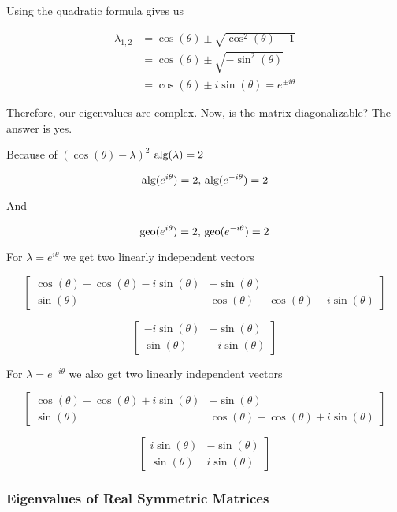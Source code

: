 Using the quadratic formula gives us 

\begin{align*}
    \lambda_{1,2} &= \cos(\theta) \pm \sqrt{\cos^2(\theta) - 1} \\ 
    &= \cos(\theta) \pm \sqrt{-\sin^2(\theta)} \\
    &= \cos(\theta) \pm i\sin(\theta) = e^{\pm i\theta}
\end{align*}

Therefore, our eigenvalues are complex. Now, is the matrix diagonalizable? The answer is yes. 

Because of  \((\cos(\theta) - \lambda)^2\) \(\text{alg}(\lambda) = 2\)

\[
    \text{alg}(e^{i\theta}) =  2, \, \text{alg}(e^{-i\theta}) = 2
\]

And 

\[
    \text{geo}(e^{i\theta}) = 2, \, \text{geo}(e^{-i\theta}) = 2
\]

For \(\lambda = e^{i\theta}\) we get two linearly independent vectors

\[
    \begin{bmatrix}
        \cos(\theta) - \cos(\theta) - i\sin(\theta) & -\sin(\theta) \\
        \sin(\theta) & \cos(\theta) - \cos(\theta) - i\sin(\theta)
    \end{bmatrix}
\]

\[
    \begin{bmatrix}
        - i\sin(\theta) & -\sin(\theta) \\ 
        \sin(\theta) &    -i\sin(\theta)
    \end{bmatrix}
\]

For \(\lambda = e^{-i\theta}\) we also get two linearly independent vectors

\[
    \begin{bmatrix}
        \cos(\theta) - \cos(\theta) +i\sin(\theta) & -\sin(\theta) \\
        \sin(\theta) & \cos(\theta) - \cos(\theta) +i\sin(\theta)
    \end{bmatrix}
\]

\[
    \begin{bmatrix}
        i\sin(\theta) & -\sin(\theta) \\ 
        \sin(\theta) &    i\sin(\theta)
    \end{bmatrix}
\]

\subsubsection{Eigenvalues of Real Symmetric Matrices}

